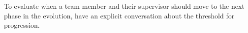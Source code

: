 To evaluate when a team member and their supervisor should move to the next phase in the evolution, have an explicit conversation about the threshold for progression.





